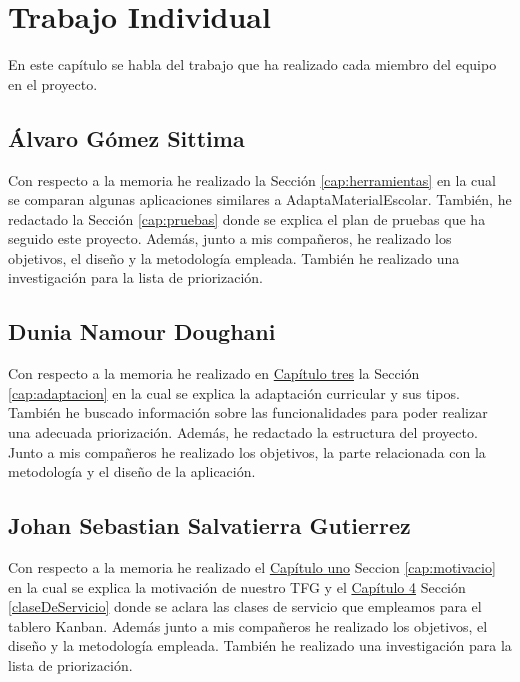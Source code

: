 \chapter{Trabajo Individual}
\label{cap:TrabajoIndividual}

En este capítulo se habla del trabajo que ha realizado cada miembro del equipo en el proyecto.

\section{Álvaro Gómez Sittima}
Con respecto a la memoria he realizado la Sección \ref{cap:herramientas} en la cual se comparan algunas aplicaciones similares a AdaptaMaterialEscolar. También, he redactado la Sección \ref{cap:pruebas} donde se explica el plan de pruebas que ha seguido este proyecto. Además, junto a mis compañeros, he realizado los objetivos, el diseño y la metodología empleada. También he realizado una investigación para la lista de priorización.

\section{Dunia Namour Doughani}
Con respecto a la memoria he realizado en {\hyperref[cap:estadoDelArte]{Capítulo tres}} la Sección \ref{cap:adaptacion} en la cual se explica la adaptación curricular y sus tipos. También he buscado información sobre las funcionalidades para poder realizar una adecuada priorización. Además, he redactado la estructura del proyecto. Junto a mis compañeros he realizado los objetivos, la parte relacionada con la metodología y el diseño de la aplicación.

\section{Johan Sebastian Salvatierra Gutierrez}
Con respecto a la memoria he realizado el {\hyperref[cap:motivacio]{Capítulo uno}} Seccion \ref{cap:motivacio} en la cual se explica la motivación de nuestro TFG y el {\hyperref[claseDeServicio]{Capítulo 4}} Sección \ref{claseDeServicio} donde se aclara las clases de servicio que empleamos para el tablero Kanban.
Además junto a mis compañeros he realizado los objetivos, el diseño y la metodología empleada. También he realizado una investigación para la lista de priorización.
